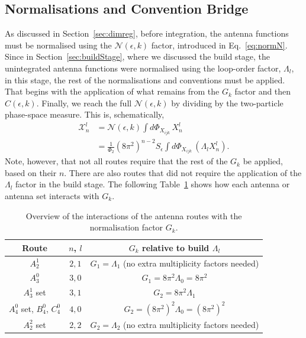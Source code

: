 

\iffalse

\subsection{Normalisations and Convention Bridge}

As discussed in Section~\ref{sec:dimreg}, before integration, the antenna functions must be 
normalised using the $\mathcal N(\epsilon, k)$ factor, introduced in Eq.~\eqref{eq:normN}. 
Since in Section~\ref{sec:buildStage}, where we discussed the build stage, the unintegrated
antenna functions were normalised using the loop-order factor, $\Lambda_l$, in this stage, 
the rest of the normalisations and conventions must be applied. That begins with the 
application of what remains from the $G_k$ factor and then $C(\epsilon, k)$. Finally, we 
reach the full $\mathcal N(\epsilon, k)$ by dividing by the two-particle phase-space measure. 
This is, schematically,
\begin{equation}
    \begin{split}
        \mathcal X_n^l &= \mathcal N(\epsilon, k)\int d\Phi_{X_{ijk}}\, X_n^l\\
                       &= \frac{1}{\Phi_2}\left(8\pi^2\right)^{n-2}S_\epsilon\int d\Phi_{X_{ijk}}\,\left(\Lambda_l X_n^l\right).
    \end{split}
\end{equation}
Note, however, that not all routes require that the rest of the $G_k$ be applied, based on 
their $n$. There are also routes that did not require the application of the $\Lambda_l$
factor in the build stage. The following Table~\ref{tab:GkNorm} shows how each antenna or
antenna set interacts with $G_k$.

\begin{table}[h!]
\centering
\renewcommand{\arraystretch}{1.3}
  \begin{tabular}{|c|c|c|} 
   \hline
   \textbf{Route} & $n$, $l$ & $G_k$\textbf{ relative to build }$\Lambda_l$ \\ 
   \hline
   $A_2^1$ & $2,1$ & $G_1=\Lambda_1$ (no extra multiplicity factors needed) \\ \hline
   $A_3^0$ & $3,0$ & $G_1=8\pi^2\Lambda_0=8\pi^2$ \\ \hline
   $A_3^1$ set & $3,1$ & $G_2=8\pi^2\Lambda_1$ \\ \hline
   $A_4^0$ set, $B_4^0$, $C_4^0$ & $4,0$ & $G_2=(8\pi^2)^2\Lambda_0=(8\pi^2)^2$ \\ \hline
   $A_2^2$ set & $2,2$ & $G_2=\Lambda_2$ (no extra multiplicity factors needed) \\ \hline
  \end{tabular}
  
  \caption{Overview of the interactions of the antenna routes with the normalisation factor $G_k$.}
\label{tab:GkNorm}
\end{table}


